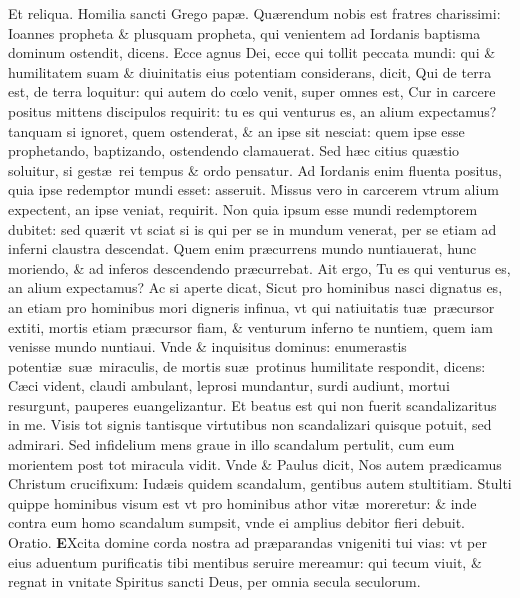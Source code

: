 \documentclass[a5paper,10pt]{book}
\def\ae{æ}
\def\oe{œ}
\begin{document}
\begin{multicols*}{2}
\newline \color{red} Et reliqua. Homilia sancti Grego pap\ae. \color{black}
\vspace{-1.25em}
\newline \color{red} Q\color{black}u\ae rendum nobis est fratres %
charissimi: Ioannes propheta \& plusquam propheta, qui venientem ad Iordanis baptisma dominum ostendit, dicens.
Ecce agnus Dei, ecce qui tollit peccata mundi: qui \& humilitatem suam \& diuinitatis eius potentiam considerans, dicit, Qui de terra est, de terra loquitur: qui autem do c\oe lo venit, super omnes est, Cur in carcere positus mittens discipulos requirit: tu es qui venturus es, an alium expectamus? tanquam si ignoret, quem ostenderat, \& an ipse sit nesciat: quem ipse esse prophetando, baptizando, ostendendo clamauerat.
Sed h\ae c citius qu\ae stio soluitur, si gest\ae \ rei tempus \& ordo pensatur.
Ad Iordanis enim fluenta positus, quia ipse redemptor mundi esset: asseruit.
Missus vero in carcerem vtrum alium expectent, an ipse veniat, requirit.
Non quia ipsum esse mundi redemptorem dubitet: sed qu\ae rit vt sciat si is qui per se in mundum venerat, per se etiam ad inferni claustra descendat.
Quem enim pr\ae currens mundo nuntiauerat, hunc moriendo, \& ad inferos descendendo pr\ae currebat.
Ait ergo, Tu es qui venturus es, an alium expectamus?
Ac si aperte dicat, Sicut pro hominibus nasci dignatus es, an etiam pro hominibus mori digneris infinua, vt qui natiuitatis tu\ae \ pr\ae cursor extiti, mortis etiam pr\ae cursor fiam, \& venturum inferno te nuntiem, quem iam venisse mundo nuntiaui.
Vnde \& inquisitus dominus: enumerastis potenti\ae \ su\ae \ miraculis, de mortis su\ae \ protinus humilitate respondit, dicens: C\ae ci vident, claudi ambulant, leprosi mundantur, surdi audiunt, mortui resurgunt, pauperes euangelizantur.
Et beatus est qui non fuerit scandalizaritus in me.
Visis tot signis tantisque virtutibus non scandalizari quisque potuit, sed admirari.
Sed infidelium mens graue in illo scandalum pertulit, cum eum morientem post tot miracula vidit.
Vnde \& Paulus dicit, Nos autem pr\ae dicamus Christum crucifixum: Iud\ae is quidem scandalum, gentibus autem stultitiam.
Stulti quippe hominibus visum est vt pro hominibus athor vit\ae \ moreretur: \& inde contra eum homo scandalum sumpsit, vnde ei amplius debitor fieri debuit. \quad \color{red} Oratio. \color{black}
\vspace{-.25em}
\lettrine[lines=2]{\bfseries \color{red} E}{}Xcita domine corda nostra ad pr\ae parandas vnigeniti tui vias: vt per eius aduentum purificatis tibi mentibus seruire mereamur: qui tecum viuit, \& regnat in vnitate Spiritus sancti Deus, per omnia secula seculorum.

\end{multicols*}
\end{document}

